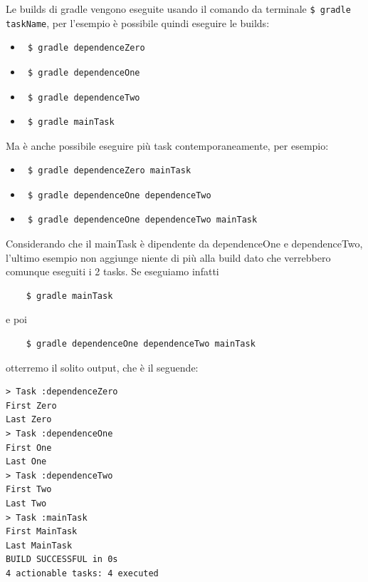 Le builds di gradle vengono eseguite usando il comando da terminale \texttt{\$ gradle taskName}, per l'esempio è possibile quindi eseguire le builds:
\begin{itemize}
    \item \begin{verbatim} $ gradle dependenceZero \end{verbatim}
    \item \begin{verbatim} $ gradle dependenceOne \end{verbatim}
    \item \begin{verbatim} $ gradle dependenceTwo \end{verbatim}
    \item \begin{verbatim} $ gradle mainTask \end{verbatim}
\end{itemize}
Ma è anche possibile eseguire più task contemporaneamente, per esempio:
\begin{itemize}
    \item \begin{verbatim} $ gradle dependenceZero mainTask\end{verbatim}
    \item \begin{verbatim} $ gradle dependenceOne dependenceTwo \end{verbatim}
    \item \begin{verbatim} $ gradle dependenceOne dependenceTwo mainTask\end{verbatim}
\end{itemize}
Considerando che il mainTask è dipendente da dependenceOne e dependenceTwo, l'ultimo esempio non aggiunge niente di più alla build dato che verrebbero comunque eseguiti i 2 tasks. Se eseguiamo infatti
\begin{verbatim}
    $ gradle mainTask \end{verbatim} 
e poi 
\begin{verbatim}
    $ gradle dependenceOne dependenceTwo mainTask \end{verbatim}
otterremo il solito output, che è il seguende:
\label{outMainTask}
\begin{verbatim}
> Task :dependenceZero 
First Zero
Last Zero
> Task :dependenceOne 
First One
Last One
> Task :dependenceTwo 
First Two
Last Two
> Task :mainTask 
First MainTask
Last MainTask
BUILD SUCCESSFUL in 0s
4 actionable tasks: 4 executed\end{verbatim} 
